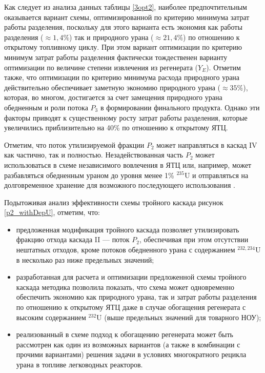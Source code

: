 Как следует из анализа данных таблицы \ref{3opt2}, наиболее предпочтительным оказывается вариант схемы, оптимизированной по критерию минимума затрат работы разделения, поскольку для этого варианта есть экономия как работы разделения ($\approx 1,4\%$) так и природного урана ($\approx 21,4\%$) по отношению к открытому топливному циклу. При этом вариант оптимизации по критерию минимум затрат работы разделения фактически тождественен варианту оптимизации по величине степени извлечения из регенерата ($Y_E$). Отметим также, что оптимизации по критерию минимума расхода природного урана действительно обеспечивает заметную экономию природного урана ($\approx 35\%$), которая, во многом, достигается за счет замещения природного урана обедненным и роли потока $P_3$ в формировании финального продукта. Однако эти факторы приводят к существенному росту затрат работы разделения, которые увеличились приблизительно на 40\% по отношению к открытому ЯТЦ.

Отметим, что поток утилизируемой фракции $P_2$ может направляться в каскад IV как частично, так и полностью. Незадействованная часть $P_2$ может использоваться в схеме независимого вовлечения в ЯТЦ или, например, может разбавляться обедненным ураном до уровня менее 1\% $^{235}$U и отправляться на долговременное хранение для возможного последующего использования \cite{EXTvodolazskihSposobIzotopnogoVosstanovleniya}.

Подытоживая анализ эффективности схемы тройного каскада рисунок \ref{p2_withDepU}, отметим, что:

\begin{itemize}
    \item предложенная модификация тройного каскада позволяет утилизировать фракцию отхода каскада II --- поток $P_2$, обеспечивая при этом отсутствии нештатных отходов, кроме потоков обедненного урана с содержанием $^{232,234}$U в несколько раз ниже предельных значений; 
    \item разработанная для расчета и оптимизации предложенной схемы тройного каскада методика позволила показать, что схема может одновременно обеспечить экономию как природного урана, так и затрат работы разделения по отношению к открытому ЯТЦ даже в случае обогащения регенерата с высоким содержанием $^{232}$U (выше предельных значений для товарного НОУ); 
    \item реализованный в схеме подход к обогащению регенерата может быть рассмотрен как один из возможных вариантов (а также в комбинации с прочими вариантами) решения задачи в условиях многократного рецикла урана в топливе легководных реакторов.
\end{itemize}

